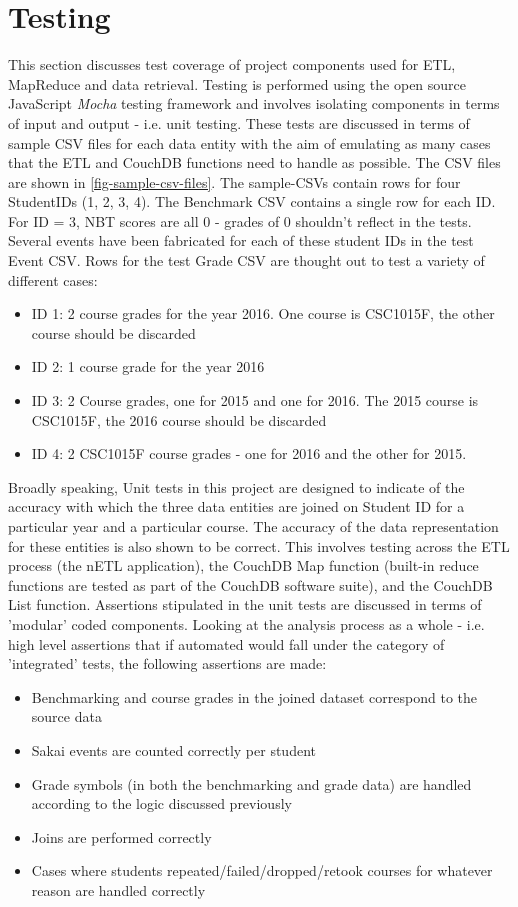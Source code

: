 \section{Testing}
This section discusses test coverage of project components used for ETL, MapReduce and data retrieval. Testing is performed using the open source JavaScript \textit{Mocha} testing framework \cite{mochaTest} and involves isolating components in terms of input and output - i.e. unit testing. These tests are discussed in terms of sample CSV files for each data entity with the aim of emulating as many cases that the ETL and CouchDB functions need to handle as possible. The CSV files are shown in \ref{fig-sample-csv-files}. The sample-CSVs contain rows for four StudentIDs (1, 2, 3, 4). The Benchmark CSV contains a single row for each ID. For ID = 3, NBT scores are all 0 - grades of 0 shouldn't reflect in the tests. Several events have been fabricated for each of these student IDs in the test Event CSV. Rows for the test Grade CSV are thought out to test a variety of different cases:

\begin{itemize}
    \item ID 1: 2 course grades for the year 2016. One course is CSC1015F, the other course should be discarded
    \item ID 2: 1 course grade for the year 2016
    \item ID 3: 2 Course grades, one for 2015 and one for 2016. The 2015 course is CSC1015F, the 2016 course should be discarded
    \item ID 4: 2 CSC1015F course grades - one for 2016 and the other for 2015.
\end{itemize}

Broadly speaking, Unit tests in this project are designed to indicate of the accuracy with which the three data entities are joined on Student ID for a particular year and a particular course. The accuracy of the data representation for these entities is also shown to be correct. This involves testing across the ETL process (the nETL application), the CouchDB Map function (built-in reduce functions are tested as part of the CouchDB software suite), and the CouchDB List function. Assertions stipulated in the unit tests are discussed in terms of 'modular' coded components. Looking at the analysis process as a whole - i.e. high level assertions that if automated would fall under the category of 'integrated' tests, the following assertions are made:

\begin{itemize}
    \item Benchmarking and course grades in the joined dataset correspond to the source data
    \item Sakai events are counted correctly per student
    \item Grade symbols (in both the benchmarking and grade data) are handled according to the logic discussed previously
    \item Joins are performed correctly
    \item Cases where students repeated/failed/dropped/retook courses for whatever reason are handled correctly
\end{itemize}

